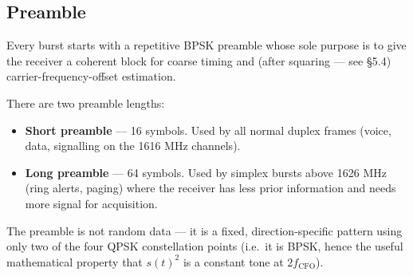 \documentclass[11pt,a4paper]{article}
\begin{document}
\begin{center}
\end{center}

\subsection{Preamble}

Every burst starts with a repetitive BPSK preamble whose sole purpose is
to give the receiver a coherent block for coarse timing and (after
squaring — see \S5.4) carrier-frequency-offset estimation.

There are two preamble lengths:
\begin{itemize}
\item \textbf{Short preamble} — 16 symbols. Used by all normal duplex
      frames (voice, data, signalling on the 1616 MHz
      channels).
\item \textbf{Long preamble} — 64 symbols. Used by simplex bursts
      above 1626 MHz (ring alerts, paging) where the receiver has less
      prior information and needs more signal for acquisition.
\end{itemize}

The preamble is not random data — it is a fixed, direction-specific
pattern using only two of the four QPSK constellation points (i.e.\ it
is BPSK, hence the useful mathematical property that $s(t)^2$ is a
constant tone at $2 f_\text{CFO}$).
\end{document}
